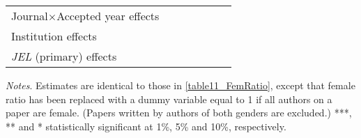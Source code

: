 \begin{table}
\begin{threeparttable}
\begin{tabular}{p{3.78cm}S@{}S@{}S@{}S@{}S@{}S@{}}
            Journal\(\times\)Accepted year effects &               &               &           {}   &               &               &           {}   \\
            Institution effects           &           {}   &           {}   &           {}   &           {}   &           {}   &           {}   \\
            \textit{JEL} (primary) effects&               &               &               &           {}   &           {}   &           {}   \\
            \bottomrule
        \end{tabular}
        \begin{tablenotes}
            \tiny
            \item \textit{Notes}. Estimates are identical to those in \autoref{table11_FemRatio}, except that female ratio has been replaced with a dummy variable equal to 1 if all authors on a paper are female. (Papers written by authors of both genders are excluded.) ***, ** and * statistically significant at 1\%, 5\% and 10\%, respectively.
        \end{tablenotes}
    \end{threeparttable}
\end{table}